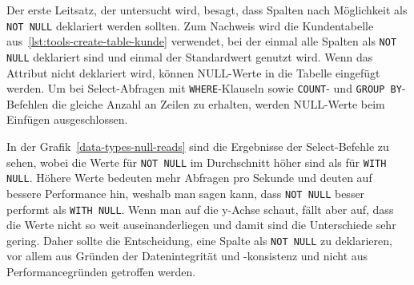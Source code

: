 Der erste Leitsatz, der untersucht wird, besagt, dass Spalten nach Möglichkeit als \texttt{NOT NULL} deklariert werden sollten.
Zum Nachweis wird die Kundentabelle aus~\ref{lst:tools-create-table-kunde} verwendet, bei der einmal alle Spalten als \texttt{NOT NULL} deklariert sind und einmal der Standardwert genutzt wird.
Wenn das Attribut nicht deklariert wird, können NULL-Werte in die Tabelle eingefügt werden.
Um bei Select-Abfragen mit \texttt{WHERE}-Klauseln sowie \texttt{COUNT}- und \texttt{GROUP BY}-Befehlen die gleiche Anzahl an Zeilen zu erhalten, werden NULL-Werte beim Einfügen ausgeschlossen.

In der Grafik~\ref{data-types-null-reads} sind die Ergebnisse der Select-Befehle zu sehen, wobei die Werte für \texttt{NOT NULL} im Durchschnitt höher sind als für \texttt{WITH NULL}.
Höhere Werte bedeuten mehr Abfragen pro Sekunde und deuten auf bessere Performance hin, weshalb man sagen kann, dass \texttt{NOT NULL} besser performt als \texttt{WITH NULL}.
Wenn man auf die y-Achse schaut, fällt aber auf, dass die Werte nicht so weit auseinanderliegen und damit sind die Unterschiede sehr gering.
Daher sollte die Entscheidung, eine Spalte als \texttt{NOT NULL} zu deklarieren, vor allem aus Gründen der Datenintegrität und -konsistenz und nicht aus Performancegründen getroffen werden.

